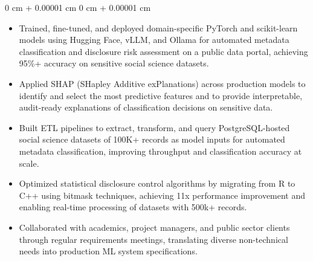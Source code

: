 \documentclass[6pt, letterpaper]{article}
\newenvironment{highlights}{
    \begin{itemize}[
        topsep=0.03 cm,
        parsep=0.03 cm,
        partopsep=0pt,
        itemsep=0pt,
        leftmargin=0 cm + 10pt
    ]
}{
    \end{itemize}
} %
\newenvironment{onecolentry}{
    \begin{adjustwidth}{
        0 cm + 0.00001 cm
    }{
        0 cm + 0.00001 cm
    }
}{
    \end{adjustwidth}
} %
\begin{document}
        \begin{onecolentry}
        \begin{highlights}

            \item Trained, fine-tuned, and deployed domain-specific PyTorch and scikit-learn models using Hugging Face, vLLM, and Ollama for automated metadata classification and disclosure risk assessment on a public data portal, achieving 95\%+ accuracy on sensitive social science datasets.
            \item Applied SHAP (SHapley Additive exPlanations) across production models to identify and select the most predictive features and to provide interpretable, audit-ready explanations of classification decisions on sensitive data.
            \item Built ETL pipelines to extract, transform, and query PostgreSQL-hosted social science datasets of 100K+ records as model inputs for automated metadata classification, improving throughput and classification accuracy at scale.
            \item Optimized statistical disclosure control algorithms by migrating from R to C++ using bitmask techniques, achieving 11x performance improvement and enabling real-time processing of datasets with 500k+ records.
            \item Collaborated with academics, project managers, and public sector clients through regular requirements meetings, translating diverse non-technical needs into production ML system specifications.

        \end{highlights}
        \end{onecolentry}
\end{document}
